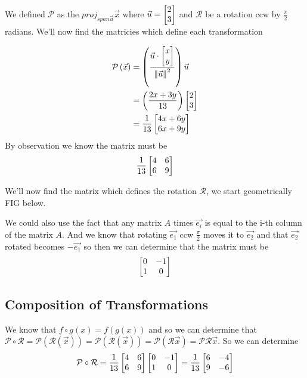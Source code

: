 \documentclass[11pt]{book}
\begin{document}
We defined $\mathcal{P}$ as the $\mathit{proj}_{\mathit{span} {\vec{u}} }
{\vec{x}} $ where $\vec{u} = \begin{bmatrix} 2 \\ 3 \end{bmatrix}$ and $\mathcal{R}$ be a rotation ccw
by $\frac{\pi }{2}$ radians. We'll now find the matricies which define each
transformation

\begin{eg}
    \begin{align*}
        \mathcal{P}\left(\vec{x}\right) &= \left( \frac{\vec{u} \cdot \begin{bmatrix} x \\ y\end{bmatrix}}{\left\Vert \vec{u} \right\Vert^2} \right) \vec{u}\\
        &= \left( \frac{2x + 3y}{13} \right) \begin{bmatrix} 2 \\ 3 \end{bmatrix}\\
        &=\frac{1}{13} \begin{bmatrix} 4x + 6y \\ 6x + 9y \end{bmatrix}\\
    \end{align*}
    By observation we know the matrix must be
    \begin{equation*}
        \frac{1}{13} \begin{bmatrix} 4 & 6 \\ 6 & 9 \end{bmatrix}
    \end{equation*}
\end{eg}

\begin{eg}
    We'll now find the matrix which defines the rotation $\mathcal{R}$, we start
    geometrically FIG below.

    We could also use the fact that any matrix $A$ times $\vec{e_i}$ is equal to
    the i-th column of the matrix $A$. And we know that rotating $\vec{e_1}$ ccw
    $\frac{\pi }{2}$ moves it to $\vec{e_2}$ and that $\vec{e_2}$ rotated
    becomes $-\vec{e_1}$ so then we can determine that the matrix must be 
    \begin{equation*}
        \begin{bmatrix} 0 & -1 \\ 1 & 0 \end{bmatrix}
    \end{equation*}
\end{eg}


\subsection{Composition of Transformations}%
\label{sub:composition_of_transformations}

We know that $f \circ g\left(x\right) = f\left(g\left(x\right)\right)$ and so
we can determine that $\mathcal{P} \circ \mathcal{R} =
\mathcal{P}\left(\mathcal{R}\left(\vec{x}\right)\right) =
\mathcal{P}\left(\mathcal{R}\left(\vec{x}\right)\right) =
\mathcal{P}\left(\mathcal{R} \vec{x}\right) = \mathcal{P} \mathcal{R} \vec{x}$.
So we can determine 
\begin{equation*}
    \mathcal{P} \circ \mathcal{R} = \frac{1}{13}\begin{bmatrix} 4 & 6 \\ 6 & 9 \end{bmatrix} \begin{bmatrix} 0 & -1 \\ 1 & 0
    \end{bmatrix} = \frac{1}{13} \begin{bmatrix} 6 & -4 \\ 9 & -6 \end{bmatrix}
\end{equation*}
\end{document}
